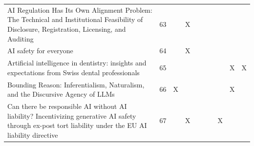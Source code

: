 \begin{landscape}
\begin{longtable}{|p{14cm}|c|c|c|c|c|c|c|c|c|}
		AI Regulation Has Its Own Alignment Problem: The Technical and Institutional Feasibility of Disclosure, Registration, Licensing, and Auditing           & 63          &                                    & X                                                         &                                                       &                                                            &                                           &                                              &                                                    &                                    \\
		AI safety for everyone                                                                                                                                  & 64          &                                    & X                                                         &                                                       &                                                            &                                           &                                              &                                                    &                                    \\
		Artificial intelligence in dentistry: insights and expectations from Swiss dental professionals                                                         & 65          &                                    &                                                           &                                                       &                                                            &                                           &                                              & X                                                  & X                                  \\
		Bounding Reason: Inferentialism, Naturalism, and the Discursive Agency of LLMs                                                                          & 66          & X                                  &                                                           &                                                       &                                                            &                                           &                                              & X                                                  &                                    \\
		Can there be responsible AI without AI liability? Incentivizing generative AI safety through ex-post tort liability under the EU AI liability directive & 67          &                                    & X                                                         &                                                       &                                                            &                                           & X                                            &                                                    &                                    \\

\end{longtable}
\end{landscape}
